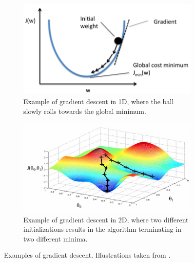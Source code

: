 \begin{figure}[H]
	\centering
	\begin{subfigure}{0.48\linewidth}
		\centering
		\includegraphics[width=\linewidth]{Materials/Theory/GD1D}
		\caption{Example of gradient descent in 1D, where the ball slowly rolls towards the global minimum.\newline}
	\end{subfigure}
	\hfill
	\begin{subfigure}{0.48\linewidth}
		\centering
		\includegraphics[width=\linewidth]{Materials/Theory/GD2D}
		\caption{Example of gradient descent in 2D, where two different initializations results in the algorithm terminating in two different minima.}
	\end{subfigure}
	\caption{Examples of gradient descent. Illustrations taken from \cite{GD1DIllustration}\cite{GD2DIllustration}.}
	\label{gdIllustrations}
\end{figure}

